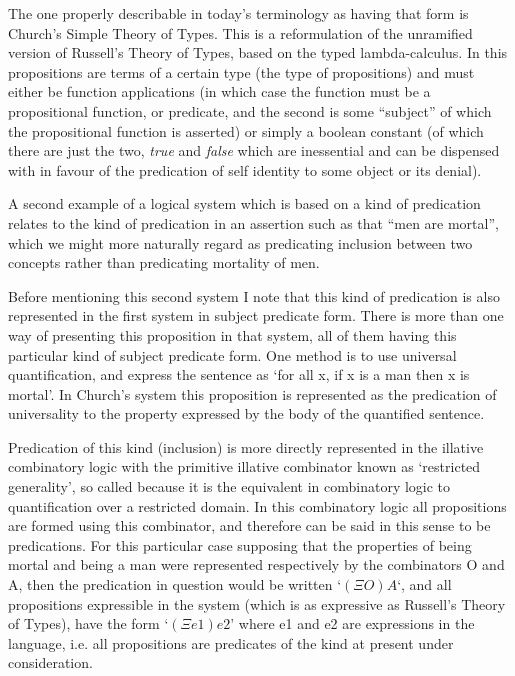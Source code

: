 \documentclass{rbjk}
\begin{document}
\begin{article}
The one properly describable in today's terminology as having that form is Church's Simple Theory of Types.
This is a reformulation of the unramified version of Russell's Theory of Types, based on the typed lambda-calculus.
In this propositions are terms of a certain type (the type of propositions) and must either be function applications (in which case the function must be a propositional function, or predicate, and the second is some ``subject'' of which the propositional function is asserted) or simply a boolean constant  (of which there are just the two, {\it true} and {\it false} which are inessential and can be dispensed with in favour of the predication of self identity to some object or its denial).

A second example of a logical system which is based on a kind of predication relates to the kind of predication in an assertion such as that ``men are mortal'', which we might more naturally regard as predicating inclusion between two concepts rather than predicating mortality of men.

Before mentioning this second system I note that this kind of predication is also represented in the first system in subject predicate form.
There is more than one way of presenting this proposition in that system, all of them having this particular kind of subject predicate form.
One method is to use universal quantification, and express the sentence as `for all x, if x is a man then x is mortal'.
In Church's system this proposition is represented as the predication of universality to the property expressed by the body of the quantified sentence.

Predication of this kind (inclusion) is more directly represented in the illative combinatory logic with the primitive illative combinator known as `restricted generality', so called because it is the equivalent in combinatory logic to quantification over a restricted domain.
In this combinatory logic all propositions are formed using this combinator, and therefore can be said in this sense to be predications.
For this particular case supposing that the properties of being mortal and being a man were represented respectively by the combinators O and A, then the predication in question would be written `$(\Xi O) A$`, and all propositions expressible in the system (which is as expressive as Russell's Theory of Types), have the form `$({\Xi} e1) e2$' where e1 and e2 are expressions in the language, i.e. all propositions are predicates of the kind at present under consideration.


\end{article}
\end{document}
